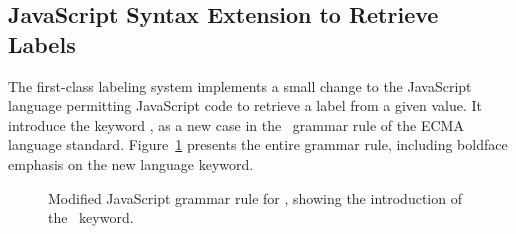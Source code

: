 \subsection{JavaScript Syntax Extension to Retrieve Labels}

The first-class labeling system implements a small change to the JavaScript language permitting JavaScript code to retrieve a label from a given value.
It introduce the keyword \mlabelof, as a new case in the \UnaryExpression\ grammar rule of the ECMA~\cite{ecma} language standard.
Figure~\ref{fig:labelof} presents the entire grammar rule, including boldface emphasis on the new language keyword.

\begin{figure}[ht]
  \centering
{}
  \caption{Modified JavaScript grammar rule for \UnaryExpression, showing the introduction of the \mlabelof\ keyword.}
  \label{fig:labelof}
\end{figure}
\vspace*{-\baselineskip}

